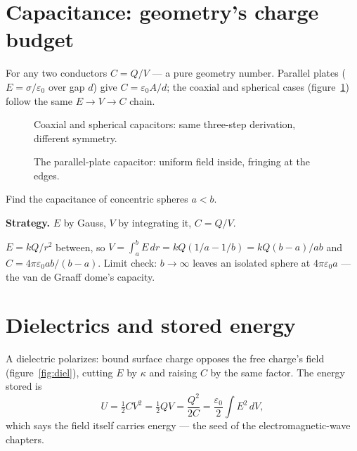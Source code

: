 \section{Capacitance: geometry's charge budget}\label{sec:pot-cap}

For any two conductors $C=Q/V$ --- a pure geometry number. Parallel
plates ($E=\sigma/\varepsilon_0$ over gap $d$) give
$C=\varepsilon_0A/d$; the coaxial and spherical cases
(figure~\ref{fig:caps}) follow the same $E\to V\to C$ chain.

\begin{figure}[htbp]\centering

\caption{Coaxial and spherical capacitors: same three-step derivation,
different symmetry.}
\label{fig:caps}
\end{figure}

\begin{figure}[htbp]\centering

\caption{The parallel-plate capacitor: uniform field inside, fringing at
the edges.}
\label{fig:plate}
\end{figure}

\begin{example}\label{ex:sphcap}
Find the capacitance of concentric spheres $a<b$.
\par\smallskip
\textbf{Strategy.} $E$ by Gauss, $V$ by integrating it, $C=Q/V$.
\begin{solution}
$E=kQ/r^{2}$ between, so
$V=\int_a^{b}E\,dr=kQ(1/a-1/b)=kQ(b-a)/ab$ and
$C=4\pi\varepsilon_0ab/(b-a)$. Limit check: $b\to\infty$ leaves an
isolated sphere at $4\pi\varepsilon_0a$ --- the van de Graaff dome's
capacity. \checkmark
\end{solution}
\end{example}

\section{Dielectrics and stored energy}\label{sec:pot-diel}

A dielectric polarizes: bound surface charge opposes the free charge's
field (figure~\ref{fig:diel}), cutting $E$ by $\kappa$ and raising $C$
by the same factor. The energy stored is
\begin{equation}
  U=\tfrac12CV^{2}=\tfrac12QV=\frac{Q^{2}}{2C}
  =\frac{\varepsilon_0}{2}\int E^{2}\,dV,\label{eq:u}
\end{equation}
which says the field itself carries energy --- the seed of the
electromagnetic-wave chapters.

